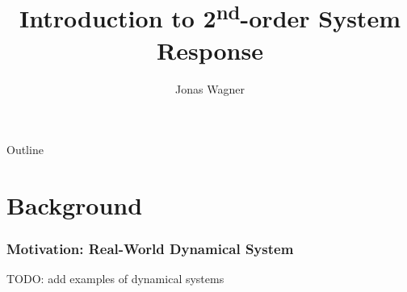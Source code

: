 \documentclass[aspectratio=169,handout]{beamer}
\title[2nd-order System Dynamics]{Introduction to 2\textsuperscript{nd}-order System Response}
\author{Jonas Wagner}
\institute[UTDallas]{The University of Texas at Dallas}
\date{}
\begin{document}
	
\begin{frame}
	\titlepage
\end{frame}


\begin{frame}{Outline}
	\tableofcontents
\end{frame}

\section{Background}
\begin{frame}
	\frametitle{Motivation: Real-World Dynamical System}
	
	TODO: add examples of dynamical systems

\end{frame}
\end{document}
